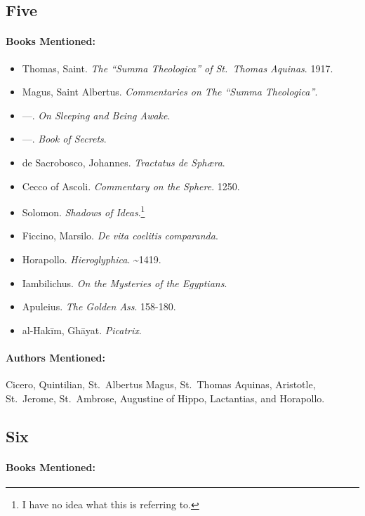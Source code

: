 \documentclass[12pt]{article}
\providecommand{\tightlist}{%
  \setlength{\itemsep}{0pt}\setlength{\parskip}{0pt}}
\begin{document}
\subsection{Five}\label{five-2}

\paragraph{Books Mentioned:}\label{books-mentioned-19}

\begin{itemize}
\tightlist
\item
  Thomas, Saint. \emph{The ``Summa Theologica'' of St.~Thomas Aquinas}. 1917.
\item
  Magus, Saint Albertus. \emph{Commentaries on The ``Summa Theologica''}.
\item
  \! ---. \emph{On Sleeping and Being Awake}.
\item
  \! ---. \emph{Book of Secrets}.
\item
  de Sacrobosco, Johannes. \emph{Tractatus de Sphæra}.
\item
  Cecco of Ascoli. \emph{Commentary on the Sphere}. 1250.
\item
  Solomon. \emph{Shadows of Ideas}.\footnote{I have no idea what this is referring to.}
\item
  Ficcino, Marsilo. \emph{De vita coelitis comparanda}.
\item
  Horapollo. \emph{Hieroglyphica}. \textasciitilde1419.
\item
  Iambilichus. \emph{On the Mysteries of the Egyptians}.
\item
  Apuleius. \emph{The Golden Ass}. 158-180.
\item
  al-Hakīm, Ghāyat. \emph{Picatrix}.
\end{itemize}

\paragraph{Authors Mentioned:}\label{authors-mentioned-14}

Cicero, Quintilian, St.~Albertus Magus, St.~Thomas Aquinas, Aristotle, St.~Jerome, St.~Ambrose, Augustine of Hippo, Lactantias, and Horapollo.

\subsection{Six}\label{six-2}

\paragraph{Books Mentioned:}\label{books-mentioned-20}
\end{document}
